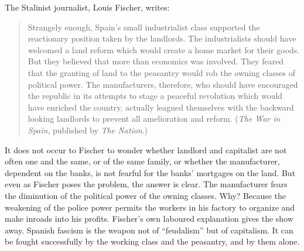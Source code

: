 The Stalinist journalist, Louis Fischer, writes:

\begin{quotation}
  Strangely enough, Spain’s small industrialist class support\-ed the reactionary position taken by the landlords. The industrialists should have welcomed a land reform which would create a home market for their goods. But they believed that more than economics was involved. They feared that the granting of land to the peasantry would rob the owning classes of political power. The manufacturers, therefore, who should have encouraged the republic in its attempts to stage a peaceful revolution which would have enriched the country, actually leagued themselves with the backward looking landlords to prevent all amelioration and reform. (\emph{The War in Spain}, published by \emph{The Nation}.)
\end{quotation}

It does not occur to Fischer to wonder whether landlord and capitalist are not often one and the same, or of the same family, or whether the manufacturer, dependent on the banks, is not fearful for the banks’ mortgages on the land. But even as Fischer poses the problem, the answer is clear. The manufacturer fears the diminution of the political power of the owning classes. Why? Because the weakening of the police power permits the workers in his factory to organize and make inroads into his profits. Fischer’s own laboured explanation gives the show away. Spanish fascism is the weapon not of ``feudalism'' but of capitalism. It can be fought successfully by the working class and the peasantry, and by them alone.